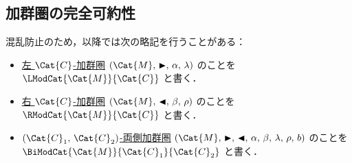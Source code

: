 \documentclass[TQFT_main]{subfiles}
\begin{document}
\subsection{加群圏の完全可約性}

\begin{marker}
    混乱防止のため，以降では次の略記を行うことがある：
    \begin{itemize}
        \item \hyperref[def:modulecat]{左 $\Cat{C}$-加群圏} $(\Cat{M},\, \btr,\, \alpha,\, \lambda)$ のことを $\LModCat{\Cat{M}}{\Cat{C}}$ と書く．
        \item \hyperref[def:modulecat]{右 $\Cat{C}$-加群圏} $(\Cat{M},\, \btl,\, \beta,\, \rho)$ のことを $\RModCat{\Cat{M}}{\Cat{C}}$ と書く．
        \item \hyperref[def:bimodulecat]{$(\Cat{C}_1,\, \Cat{C}_2)$-両側加群圏} $(\Cat{M},\, \btr,\, \btl,\, \alpha,\, \beta,\, \lambda,\, \rho,\, b)$ のことを $\BiModCat{\Cat{M}}{\Cat{C}_1}{\Cat{C}_2}$ と書く．
    \end{itemize}
\end{marker}
\end{document}
